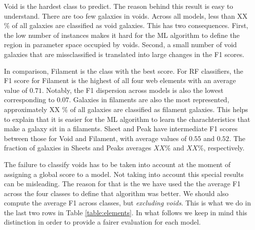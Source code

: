 \documentclass[usenatbib]{mnras}
\begin{document}
Void is the hardest class to predict. 
The reason behind this result is easy to understand. 
There are too few galaxies in voids. 
Across all models, less than XX $\%$ of all galaxies
are classified as void galaxies. 
This has two consequences.
First, the low number of instances makes it hard for the ML algorithm to
define the region in parameter space occupied by voids.
Second, a small number of void galaxies that are missclassified is
translated into large changes in the F1 scores.

In comparison, Filament is the class with the best score.
For RF classifiers, the F1 score for Filament is the highest of all four
web elements with an average value of  $0.71$.
Notably, the F1 dispersion across models is also the lowest
corresponding to $0.07$.
Galaxies in filaments are also the most represented,
approximately XX $\%$ of all galaxies are classified as filament
galaxies.
This helps to explain that it is easier for the ML algorithm to learn
the charachteristics that make a galaxy sit in a filaments.
Sheet and Peak have intermediate F1 scores between
those for Void and Filament, with average values of $0.55$ and $0.52$.
The fraction of galaxies in Sheets and Peaks averages $XX\%$ and $XX\%$,
respectively. 

The failure to classify voids has to be taken into account at the
moment of assigning a global score to a model.
Not taking into account this special results can be misleading.
The reason for that is the we have used the the average F1 across the
four classes to define that algorithm was better. 
We should also compute the average F1 across classes, but
\emph{excluding voids}.
This is what we do in the last two rows in Table \ref{table:elements}.
In what follows we keep in mind this distinction in order to provide a
fairer evaluation for each model.
\end{document}

